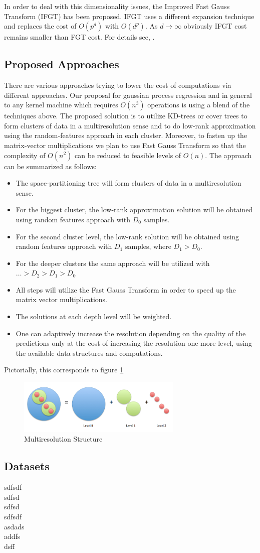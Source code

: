 \documentclass{article}
\begin{document}
In order to deal with this dimensionality issues, the Improved Fast Gauss Transform (IFGT) has  been proposed. IFGT uses a different expansion technique and replaces the cost of $O(p^d)$ with $O(d^p)$. As $d\rightarrow \infty$ obviously IFGT cost remains smaller than FGT cost. For details see, \cite{FGTkernel}.
\subsection{Proposed Approaches}
There are various approaches trying to lower the cost of computations via different approaches. Our proposal for gaussian process regression and in general to any kernel machine which requires $O(n^3)$ operations is using a blend of the techniques above. The proposed solution is to utilize KD-trees or cover trees to form clusters of data in a multiresolution sense and to do low-rank approximation using the random-features approach in each cluster. Moreover, to fasten up the matrix-vector multiplications we plan to use Fast Gauss Transform so that the complexity of $O(n^2)$ can be reduced to feasible levels of $O(n)$. The approach can be summarized as follows:
\begin{itemize}
\item The space-partitioning tree will form clusters of data in a multiresolution sense.
\item For the biggest cluster, the low-rank approximation solution will be obtained using random features approach with $D_0$ samples.
\item For the second cluster level, the low-rank solution will be obtained using random features approach with $D_1$ samples, where $D_1>D_0$.
\item For the deeper clusters the same approach will be utilized with $\dots>D_2>D_1>D_0$
\item All steps will utilize the Fast Gauss Transform in order to speed up the matrix vector multiplications.
\item The solutions at each depth level will be weighted.
\item One can adaptively increase the resolution depending on the quality of the predictions only at the cost of increasing the resolution one more level, using the available data structures and computations.
\end{itemize}
Pictorially, this corresponds to figure \ref{fig:multiresolution}
\begin{figure}[h!] \label{fig:multiresolution}
  \caption{Multiresolution Structure}
  \centering
    \includegraphics[width=0.7\textwidth]{multiresolution}
\end{figure}
\subsection{Datasets}
sdfsdf \\
sdfsd\\
sdfsd\\
sdfsdf\\
asdads\\
addfs\\
dsff\\


\newpage


\end{document}

